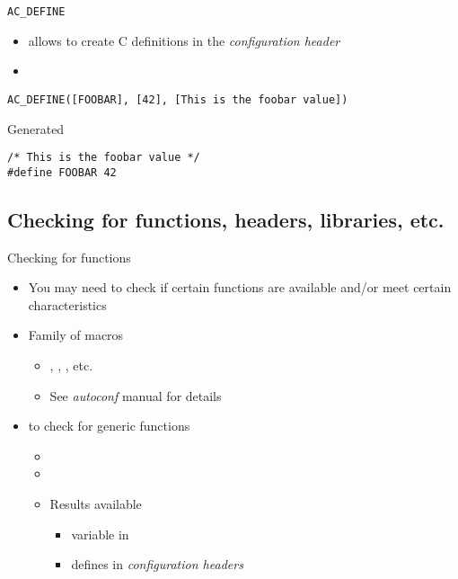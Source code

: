 \begin{frame}[fragile]{{\tt AC\_DEFINE}}

  \begin{itemize}
  \item {} allows to create C definitions in the {\em
      configuration header}
  \item {}
  \end{itemize}

  \begin{block}{}
\begin{verbatim}
AC_DEFINE([FOOBAR], [42], [This is the foobar value])
\end{verbatim}
  \end{block}

  \begin{block}{Generated }
\begin{verbatim}
/* This is the foobar value */
#define FOOBAR 42
\end{verbatim}
\end{block}

\end{frame}

\subsection{Checking for functions, headers, libraries, etc.}

\begin{frame}{Checking for functions}
  \begin{itemize}
  \item You may need to check if certain functions are available
    and/or meet certain characteristics
  \item Family of  macros
    \begin{itemize}
    \item {}, , , etc.
    \item See {\em autoconf} manual for details
    \end{itemize}
  \item {} to check for generic functions
    \begin{itemize}
    \item {}
    \item {}
    \item Results available
      \begin{itemize}
      \item {} variable in
      \item {} defines in {\em configuration
          headers}
      \end{itemize}
    \end{itemize}
  \end{itemize}
\end{frame}

